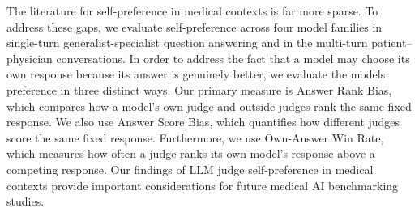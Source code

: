 \documentclass[11pt]{article}
\begin{document}
The literature for self-preference in medical contexts is far more sparse. To address these gaps, we evaluate self-preference across four model families in single-turn generalist-specialist question answering and in the multi-turn patient–physician conversations. In order to address the fact that a model may choose its own response because its answer is genuinely better, we evaluate the models preference in three distinct ways. Our primary measure is Answer Rank Bias, which compares how a model's own judge and outside judges rank the same fixed response. We also use Answer Score Bias, which quantifies how different judges score the same fixed response. Furthermore, we use Own-Answer Win Rate, which measures how often a judge ranks its own model's response above a competing response. Our findings of LLM judge self-preference in medical contexts provide important considerations for future medical AI benchmarking studies.




\end{document}
